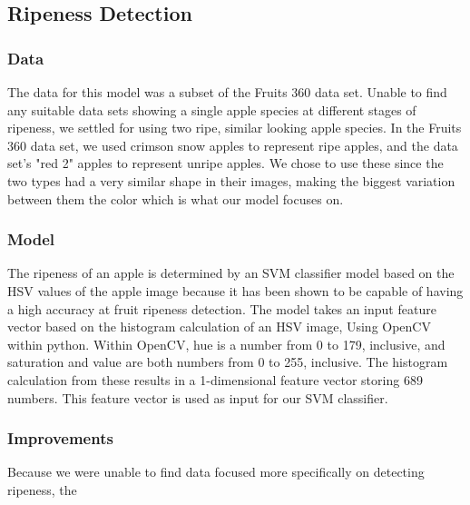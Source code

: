 \subsection{Ripeness Detection}
\subsubsection{Data}
The data for this model was a subset of the Fruits 360 data set. %
Unable to find any suitable data sets showing a single apple species at different stages of ripeness, we settled for using two ripe, similar looking apple species.
In the Fruits 360 data set, we used crimson snow apples to represent ripe apples, and the data set's "red 2" apples to represent unripe apples. We  chose to use these since the two types had a very similar shape in their images, making the biggest variation between them the color which is what our model focuses on.

\subsubsection{Model}
The ripeness of an apple is determined by an SVM classifier model based on the HSV values of the apple image because it has been shown to be capable of having a high accuracy at fruit ripeness detection\cite{HSVRipeness}.
The model takes an input feature vector based on the histogram calculation of an HSV image, Using OpenCV within python.
Within OpenCV, hue is a number from 0 to 179, inclusive, and saturation and value are both numbers from 0 to 255, inclusive.
The histogram calculation from these results in a 1-dimensional feature vector storing 689 numbers. 
This feature vector is used as input for our SVM classifier.

\subsubsection{Improvements}
Because we were unable to find data focused more specifically on detecting ripeness, the


